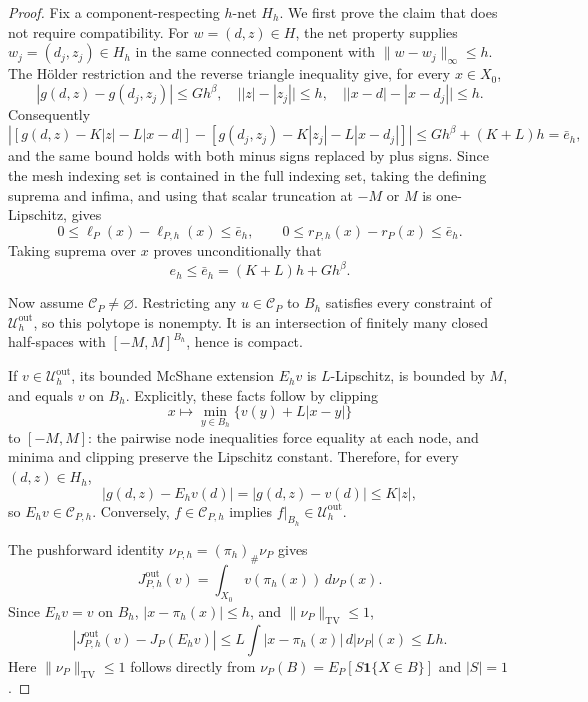 \documentclass{article}
\begin{document}
\begin{proof}
Fix a component-respecting \(h\)-net \(H_h\).  We first prove the claim that does not require compatibility.  For \(w=(d,z)\in H\), the net property supplies \(w_j=(d_j,z_j)\in H_h\) in the same connected component with \(\|w-w_j\|_\infty\leq h\).  The H\"older restriction and the reverse triangle inequality give, for every \(x\in X_0\),
\[
 |g(d,z)-g(d_j,z_j)|\leq Gh^\beta,
 \quad
 \bigl||z|-|z_j|\bigr|\leq h,
 \quad
 \bigl||x-d|-|x-d_j|\bigr|\leq h.
\]
Consequently
\[
 \left|[g(d,z)-K|z|-L|x-d|]-[g(d_j,z_j)-K|z_j|-L|x-d_j|]\right|
 \leq Gh^\beta+(K+L)h=\bar e_h,
\]
and the same bound holds with both minus signs replaced by plus signs.  Since the mesh indexing set is contained in the full indexing set, taking the defining suprema and infima, and using that scalar truncation at \(-M\) or \(M\) is one-Lipschitz, gives
\[
 0\leq\ell_P(x)-\ell_{P,h}(x)\leq\bar e_h,
 \qquad
 0\leq r_{P,h}(x)-r_P(x)\leq\bar e_h.
\]
Taking suprema over \(x\) proves unconditionally that
\[
 e_h\leq\bar e_h=(K+L)h+Gh^\beta.
\]

Now assume \(\mathcal C_P\neq\varnothing\).  Restricting any \(u\in\mathcal C_P\) to \(B_h\) satisfies every constraint of \(\mathcal U_h^{\mathrm{out}}\), so this polytope is nonempty.  It is an intersection of finitely many closed half-spaces with \([-M,M]^{B_h}\), hence is compact.

If \(v\in\mathcal U_h^{\mathrm{out}}\), its bounded McShane extension \(E_hv\) is \(L\)-Lipschitz, is bounded by \(M\), and equals \(v\) on \(B_h\).  Explicitly, these facts follow by clipping
\[
 x\longmapsto\min_{y\in B_h}\{v(y)+L|x-y|\}
\]
to \([-M,M]\): the pairwise node inequalities force equality at each node, and minima and clipping preserve the Lipschitz constant.  Therefore, for every \((d,z)\in H_h\),
\[
 |g(d,z)-E_hv(d)|=|g(d,z)-v(d)|\leq K|z|,
\]
so \(E_hv\in\mathcal C_{P,h}\).  Conversely, \(f\in\mathcal C_{P,h}\) implies \(f|_{B_h}\in\mathcal U_h^{\mathrm{out}}\).

The pushforward identity \(\nu_{P,h}=(\pi_h)_\#\nu_P\) gives
\[
 J_{P,h}^{\mathrm{out}}(v)
 =\int_{X_0}v(\pi_h(x))\,d\nu_P(x).
\]
Since \(E_hv=v\) on \(B_h\), \(|x-\pi_h(x)|\leq h\), and \(\|\nu_P\|_{\mathrm{TV}}\leq1\),
\[
 \left|J_{P,h}^{\mathrm{out}}(v)-J_P(E_hv)\right|
 \leq L\int|x-\pi_h(x)|\,d|\nu_P|(x)
 \leq Lh.
\]
Here \(\|\nu_P\|_{\mathrm{TV}}\leq1\) follows directly from \(\nu_P(B)=E_P[S\mathbf 1\{X\in B\}]\) and \(|S|=1\).


\end{proof}
\end{document}
